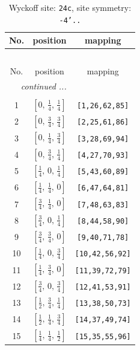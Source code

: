 \documentclass[fleqn,8pt]{jsarticle}
\begin{document}
\begin{longtable}{ccc}
\caption{Wyckoff site: {\tt 24c}, site symmetry: {\tt -4'..}}
 \\
 \hline \hline
No. & position & mapping \\ \hline \endfirsthead

\multicolumn{2}{l}{\tablename\ \thetable{}} \\
 \hline \hline
No. & position & mapping \\ \hline \endhead

 \hline \hline
\multicolumn{2}{r}{\footnotesize\it continued ...} \\ \endfoot

 \hline \hline
\multicolumn{2}{r}{} \\ \endlastfoot

1 & $\left[ 0,\, \frac{1}{4},\, \frac{1}{4} \right]$ & {\tt [1,26,62,85]} \\ \hline
2 & $\left[ 0,\, \frac{3}{4},\, \frac{3}{4} \right]$ & {\tt [2,25,61,86]} \\ \hline
3 & $\left[ 0,\, \frac{1}{4},\, \frac{3}{4} \right]$ & {\tt [3,28,69,94]} \\ \hline
4 & $\left[ 0,\, \frac{3}{4},\, \frac{1}{4} \right]$ & {\tt [4,27,70,93]} \\ \hline
5 & $\left[ \frac{1}{4},\, 0,\, \frac{1}{4} \right]$ & {\tt [5,43,60,89]} \\ \hline
6 & $\left[ \frac{1}{4},\, \frac{1}{4},\, 0 \right]$ & {\tt [6,47,64,81]} \\ \hline
7 & $\left[ \frac{3}{4},\, \frac{1}{4},\, 0 \right]$ & {\tt [7,48,63,83]} \\ \hline
8 & $\left[ \frac{3}{4},\, 0,\, \frac{1}{4} \right]$ & {\tt [8,44,58,90]} \\ \hline
9 & $\left[ \frac{3}{4},\, \frac{3}{4},\, 0 \right]$ & {\tt [9,40,71,78]} \\ \hline
10 & $\left[ \frac{1}{4},\, 0,\, \frac{3}{4} \right]$ & {\tt [10,42,56,92]} \\ \hline
11 & $\left[ \frac{1}{4},\, \frac{3}{4},\, 0 \right]$ & {\tt [11,39,72,79]} \\ \hline
12 & $\left[ \frac{3}{4},\, 0,\, \frac{3}{4} \right]$ & {\tt [12,41,53,91]} \\ \hline
13 & $\left[ \frac{1}{2},\, \frac{3}{4},\, \frac{1}{4} \right]$ & {\tt [13,38,50,73]} \\ \hline
14 & $\left[ \frac{1}{2},\, \frac{1}{4},\, \frac{3}{4} \right]$ & {\tt [14,37,49,74]} \\ \hline
15 & $\left[ \frac{1}{4},\, \frac{1}{4},\, \frac{1}{2} \right]$ & {\tt [15,35,55,96]} \\ \hline

\end{longtable}
\end{document}
